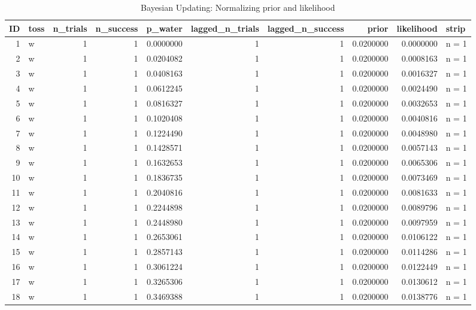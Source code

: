 \documentclass[
  letterpaper,
  DIV=11,
  numbers=noendperiod]{scrreprt}
\begin{document}
\hypertarget{tbl-bayesian-model-learning-anno6}{}
\begin{table}
\caption{\label{tbl-bayesian-model-learning-anno6}Bayesian Updating: Normalizing prior and likelihood }\tabularnewline

\centering
\begin{tabular}[t]{r|l|r|r|r|r|r|r|r|l}
\hline
ID & toss & n\_trials & n\_success & p\_water & lagged\_n\_trials & lagged\_n\_success & prior & likelihood & strip\\
\hline
1 & w & 1 & 1 & 0.0000000 & 1 & 1 & 0.0200000 & 0.0000000 & n = 1\\
\hline
2 & w & 1 & 1 & 0.0204082 & 1 & 1 & 0.0200000 & 0.0008163 & n = 1\\
\hline
3 & w & 1 & 1 & 0.0408163 & 1 & 1 & 0.0200000 & 0.0016327 & n = 1\\
\hline
4 & w & 1 & 1 & 0.0612245 & 1 & 1 & 0.0200000 & 0.0024490 & n = 1\\
\hline
5 & w & 1 & 1 & 0.0816327 & 1 & 1 & 0.0200000 & 0.0032653 & n = 1\\
\hline
6 & w & 1 & 1 & 0.1020408 & 1 & 1 & 0.0200000 & 0.0040816 & n = 1\\
\hline
7 & w & 1 & 1 & 0.1224490 & 1 & 1 & 0.0200000 & 0.0048980 & n = 1\\
\hline
8 & w & 1 & 1 & 0.1428571 & 1 & 1 & 0.0200000 & 0.0057143 & n = 1\\
\hline
9 & w & 1 & 1 & 0.1632653 & 1 & 1 & 0.0200000 & 0.0065306 & n = 1\\
\hline
10 & w & 1 & 1 & 0.1836735 & 1 & 1 & 0.0200000 & 0.0073469 & n = 1\\
\hline
11 & w & 1 & 1 & 0.2040816 & 1 & 1 & 0.0200000 & 0.0081633 & n = 1\\
\hline
12 & w & 1 & 1 & 0.2244898 & 1 & 1 & 0.0200000 & 0.0089796 & n = 1\\
\hline
13 & w & 1 & 1 & 0.2448980 & 1 & 1 & 0.0200000 & 0.0097959 & n = 1\\
\hline
14 & w & 1 & 1 & 0.2653061 & 1 & 1 & 0.0200000 & 0.0106122 & n = 1\\
\hline
15 & w & 1 & 1 & 0.2857143 & 1 & 1 & 0.0200000 & 0.0114286 & n = 1\\
\hline
16 & w & 1 & 1 & 0.3061224 & 1 & 1 & 0.0200000 & 0.0122449 & n = 1\\
\hline
17 & w & 1 & 1 & 0.3265306 & 1 & 1 & 0.0200000 & 0.0130612 & n = 1\\
\hline
18 & w & 1 & 1 & 0.3469388 & 1 & 1 & 0.0200000 & 0.0138776 & n = 1\\
\hline

\end{tabular}
\end{table}
\end{document}
